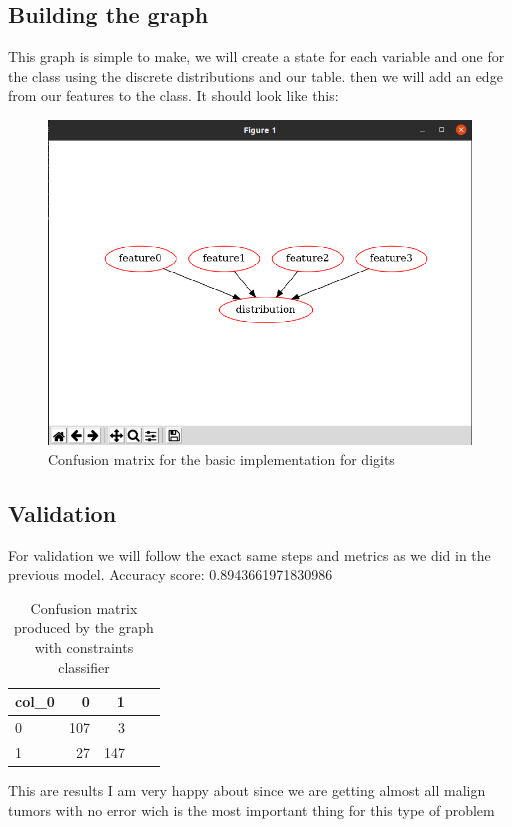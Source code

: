 \documentclass{article} %
\begin{document}
\subsection{Building the graph}
This graph is simple to make, we will create a state for each variable and one for the class using the discrete distributions and our table. then we will add an edge from our features to the class.
\bigskip
It should look  like this:
\begin{figure}[h!]
  \includegraphics[scale = 0.7]{CI.png}
  \caption{Confusion matrix for the basic implementation for digits}\hspace*{\fill}
  \label{fig:Confusion matrix for the constraint implementation for digits}
\end{figure}
\subsection{Validation}
For validation we will follow the exact same steps and metrics as we did in the previous model.
Accuracy score: 0.8943661971830986
\begin{table}[!h]
\centering
\begin{tabular}{lrrrr}
\toprule \hline
col\_0 &   0 &   1 & \\\hline
0     &  107 &   3 & \\\hline
1     &   27 &  147  \\\hline
\bottomrule \hline
\end{tabular}
\caption{Confusion matrix produced by the graph with constraints classifier}
 \label{tab:CG}
\end{table}
\bigskip
This are results I am very happy about since we are getting almost all malign tumors with no error wich is the most important thing for this type of problem
\end{document}
